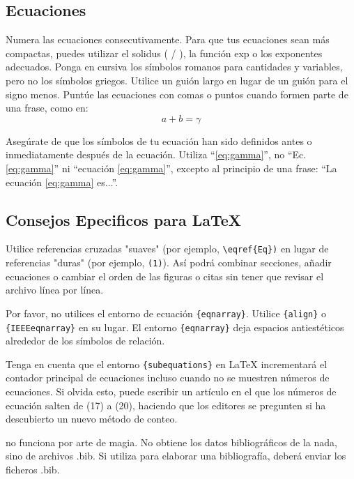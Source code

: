 \subsection{Ecuaciones} \label{subsec:ecuac}

Numera las ecuaciones consecutivamente. Para que tus ecuaciones sean más compactas, puedes utilizar el solidus ( / ), la función exp o los exponentes adecuados. Ponga en cursiva los símbolos romanos para cantidades y variables, pero no los símbolos griegos. Utilice un guión largo en lugar de un guión para el signo menos. Puntúe las ecuaciones con comas o puntos cuando formen parte de una frase, como en:
\begin{equation}
    \label{eq:gamma}
    a+b=\gamma
\end{equation}

Asegúrate de que los símbolos de tu ecuación han sido definidos antes o inmediatamente después de la ecuación. Utiliza ``\eqref{eq:gamma}'', no ``Ec. \eqref{eq:gamma}'' ni ``ecuación \eqref{eq:gamma}'', excepto al principio de una frase: ``La ecuación \eqref{eq:gamma} es...''.


\subsection{Consejos Epecificos para {\LaTeX}} \label{subsec:cons_latex}

Utilice referencias cruzadas "suaves" (por ejemplo, \verb|\eqref{Eq})| en lugar de referencias "duras" (por ejemplo, \verb|(1)|). Así podrá combinar secciones, añadir ecuaciones o cambiar el orden de las figuras o citas sin tener que revisar el archivo línea por línea. \par

Por favor, no utilices el entorno de ecuación \verb|{eqnarray}|. Utilice \verb|{align}| o \verb|{IEEEeqnarray}| en su lugar. El entorno \verb|{eqnarray}| deja espacios antiestéticos alrededor de los símbolos de relación. \par

Tenga en cuenta que el entorno \verb|{subequations}| en {\LaTeX} incrementará el contador principal de ecuaciones incluso cuando no se muestren números de ecuaciones. Si olvida esto, puede escribir un artículo en el que los números de ecuación salten de (17) a (20), haciendo que los editores se pregunten si ha descubierto un nuevo método de conteo. \par

{\BibTeX} no funciona por arte de magia. No obtiene los datos bibliográficos de la nada, sino de archivos .bib. Si utiliza {\BibTeX} para elaborar una bibliografía, deberá enviar los ficheros .bib. \par


